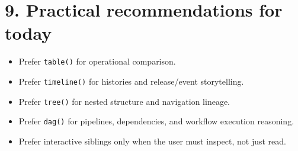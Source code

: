 \section{9. Practical recommendations for today}\label{record-020-practical-recommendations-for-today}

\begin{itemize}
\tightlist
\item
  Prefer \texttt{t\allowbreak{}a\allowbreak{}b\allowbreak{}l\allowbreak{}e\allowbreak{}(\allowbreak{})} for operational comparison.
\item
  Prefer \texttt{t\allowbreak{}i\allowbreak{}m\allowbreak{}e\allowbreak{}l\allowbreak{}i\allowbreak{}n\allowbreak{}e\allowbreak{}(\allowbreak{})} for histories and release/event storytelling.
\item
  Prefer \texttt{t\allowbreak{}r\allowbreak{}e\allowbreak{}e\allowbreak{}(\allowbreak{})} for nested structure and navigation lineage.
\item
  Prefer \texttt{d\allowbreak{}a\allowbreak{}g\allowbreak{}(\allowbreak{})} for pipelines, dependencies, and workflow execution reasoning.
\item
  Prefer interactive siblings only when the user must inspect, not just read.
\end{itemize}

